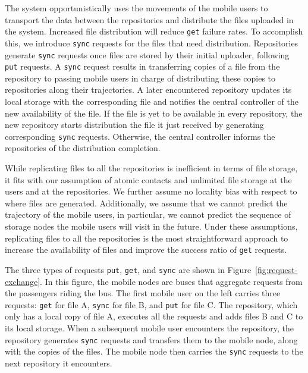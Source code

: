 The system opportunistically uses the movements of the mobile users to transport the data between the repositories and distribute the files uploaded in the system. Increased file distribution will reduce \texttt{get} failure rates. To accomplish this, we introduce \texttt{sync} requests for the files that need distribution. Repositories generate \texttt{sync} requests once files are stored by their initial uploader, following \texttt{put} requests. A \texttt{sync} request results in transferring copies of a file from the repository to passing mobile users in charge of distributing these copies to repositories along their trajectories. A later encountered repository updates its local storage with the corresponding file and notifies the central controller of the new availability of the file. If the file is yet to be available in every repository, the new repository starts distribution the file it just received by generating corresponding \texttt{sync} requests. Otherwise, the central controller informs the repositories of the distribution completion. 

While replicating files to all the repositories is inefficient in terms of file storage, it fits with our assumption of atomic contacts and unlimited file storage at the users and at the repositories. We further assume no locality bias with respect to where files are generated. Additionally, we assume that we cannot predict the trajectory of the mobile users, in particular, we cannot predict the sequence of storage nodes the mobile users will visit in the future. Under these assumptions, replicating files to all the repositories is the most straightforward approach to increase the availability of files and improve the success ratio of \texttt{get} requests.

The three types of requests \texttt{put}, \texttt{get}, and \texttt{sync} are shown in Figure~\ref{fig:request-exchange}. In this figure, the mobile nodes are buses that aggregate requests from the passengers riding the bus. The first mobile user on the left carries three requests: \texttt{get} for file A, \texttt{sync} for file B, and \texttt{put} for file C. The repository, which only has a local copy of file A, executes all the requests and adds files B and C to its local storage. When a subsequent mobile user encounters the repository, the repository generates \texttt{sync} requests and transfers them to the mobile node, along with the copies of the files. The mobile node then carries the \texttt{sync} requests to the next repository it encounters.


